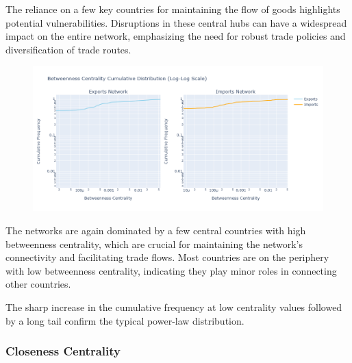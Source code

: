 \documentclass[12pt, a4paper]{article}
\begin{document}
The reliance on a few key countries for maintaining the flow of goods highlights potential vulnerabilities. Disruptions in these central hubs can have a widespread impact on the entire network, emphasizing the need for robust trade policies and diversification of trade routes.
\begin{figure}[ht]
\centering
\includegraphics[scale=0.4]{img/betweencum.png}
\label{fig:betweencum}
\end{figure}
The networks are again dominated by a few central countries with high betweenness centrality, which are crucial for maintaining the network's connectivity and facilitating trade flows. Most countries are on the periphery with low betweenness centrality, indicating they play minor roles in connecting other countries.

The sharp increase in the cumulative frequency at low centrality values followed by a long tail confirm the typical power-law distribution.
\subsubsection{Closeness Centrality}
\end{document}
